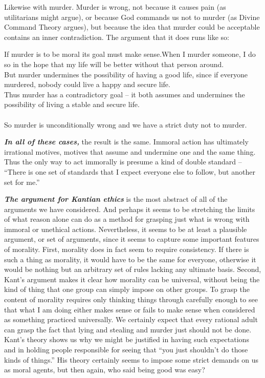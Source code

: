 \documentclass[
  12pt, openany]{book}
\theoremstyle{definition}
\theoremstyle{definition}
\theoremstyle{definition}
\theoremstyle{definition}
\theoremstyle{remark}
\begin{document}
Likewise with murder. Murder is wrong, not because it causes pain (as utilitarians might argue), or because God commands us not to murder (as Divine Command Theory argues), but because the idea that murder could be acceptable contains an inner contradiction. The argument that it does runs like so:

\begin{center}

\begin{argument}
If murder is to be moral its goal must make sense.When I murder someone, I do so in the hope that my life will be better without that person around.\\
But murder undermines the possibility of having a good life, since if everyone murdered, nobody could live a happy and secure life.\\
Thus murder has a contradictory goal -- it both assumes and undermines the possibility of living a stable and secure life.\\
~\\
So murder is unconditionally wrong and we have a strict duty not to murder.

\end{argument}


\end{center}

\textbf{\emph{In all of these cases,}} the result is the same. Immoral action has ultimately irrational motives, motives that assume and undermine one and the same thing. Thus the only way to act immorally is presume a kind of double standard -- ``There is one set of standards that I expect everyone else to follow, but another set for me.''

\textbf{\emph{The argument for Kantian ethics}} is the most abstract of all of the arguments we have considered. And perhaps it seems to be stretching the limits of what reason alone can do as a method for grasping just what is wrong with immoral or unethical actions. Nevertheless, it seems to be at least a plausible argument, or set of arguments, since it seems to capture some important features of morality. First, morality does in fact seem to require consistency. If there is such a thing as morality, it would have to be the same for everyone, otherwise it would be nothing but an arbitrary set of rules lacking any ultimate basis. Second, Kant's argument makes it clear how morality can be universal, without being the kind of thing that one group can simply impose on other groups. To grasp the content of morality requires only thinking things through carefully enough to see that what I am doing either makes sense or fails to make sense when considered as something practiced universally. We certainly expect that every rational adult can grasp the fact that lying and stealing and murder just should not be done. Kant's theory shows us why we might be justified in having such expectations and in holding people responsible for seeing that ``you just shouldn't do those kinds of things.'' His theory certainly seems to impose some strict demands on us as moral agents, but then again, who said being good was easy?
\end{document}
